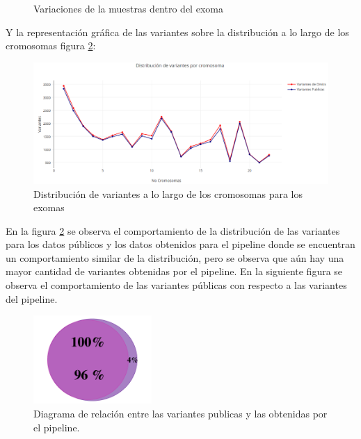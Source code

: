 \begin{figure}[H]
	\centering
	\caption{Variaciones de la muestras dentro del exoma}
	\label{f:histogramas2}
\end{figure}

Y la representación gráfica de las variantes sobre la distribución a lo largo de los cromosomas figura \ref{fig:variaciones2}:

\begin{figure}[H]
	\centering
	\includegraphics[width=1\textwidth]{Kap2/variaciones2}
	\caption{Distribución de variantes a lo largo de los cromosomas para los exomas} \label{fig:variaciones2}
\end{figure}

En la figura \ref{fig:variaciones2} se observa el comportamiento de la distribución de las variantes para los datos públicos y los datos obtenidos para el pipeline donde se encuentran un comportamiento similar de la distribución, pero se observa que aún hay una mayor cantidad de variantes obtenidas por el pipeline. En la siguiente figura se observa el comportamiento de las variantes públicas con respecto a las variantes del pipeline. 

\begin{figure}[H]
	\centering
	\includegraphics[width=0.4\textwidth]{Kap2/validacion1}
	\caption{Diagrama de relación entre las variantes publicas y las obtenidas por el pipeline.} \label{fig:diagrama2}
\end{figure}

